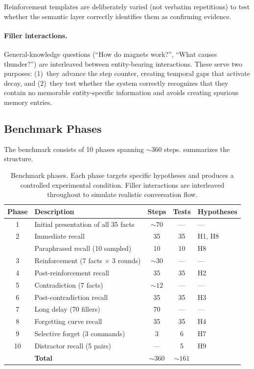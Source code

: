 \smallskip
\noindent Reinforcement templates are deliberately varied (not verbatim repetitions) to test whether the semantic layer correctly identifies them as confirming evidence.

\paragraph{Filler interactions.}
General-knowledge questions (``How do magnets work?'', ``What causes thunder?'') are interleaved between entity-bearing interactions. These serve two purposes: (1)~they advance the step counter, creating temporal gaps that activate decay, and (2)~they test whether the system correctly recognizes that they contain no memorable entity-specific information and avoids creating spurious memory entries.

\subsection{Benchmark Phases}
\label{sec:bench-phases}

The benchmark consists of 10 phases spanning ${\sim}360$ steps.  summarizes the structure.

\begin{table}[t]
  \centering
  \caption{Benchmark phases. Each phase targets specific hypotheses and produces a controlled experimental condition. Filler interactions are interleaved throughout to simulate realistic conversation flow.}
  \label{tab:phases}
  \small
  \begin{tabular}{@{}c l c c l@{}}
    \toprule
    \textbf{Phase} & \textbf{Description} & \textbf{Steps} & \textbf{Tests} & \textbf{Hypotheses} \\
    \midrule
    \rowcolor{nodeGray}
    1 & Initial presentation of all 35 facts & ${\sim}70$ & --- & --- \\
    2 & Immediate recall & 35 & 35 & H1, H8 \\
    \rowcolor{nodeGray}
      & Paraphrased recall (10 sampled) & 10 & 10 & H8 \\
    3 & Reinforcement (7 facts $\times$ 3 rounds) & ${\sim}30$ & --- & --- \\
    \rowcolor{nodeGray}
    4 & Post-reinforcement recall & 35 & 35 & H2 \\
    5 & Contradiction (7 facts) & ${\sim}12$ & --- & --- \\
    \rowcolor{nodeGray}
    6 & Post-contradiction recall & 35 & 35 & H3 \\
    7 & Long delay (70 fillers) & 70 & --- & --- \\
    \rowcolor{nodeGray}
    8 & Forgetting curve recall & 35 & 35 & H4 \\
    9 & Selective forget (3 commands) & 3 & 6 & H7 \\
    \rowcolor{nodeGray}
    10 & Distractor recall (5 pairs) & --- & 5 & H9 \\
    \midrule
    & \textbf{Total} & ${\sim}360$ & ${\sim}161$ & \\
    \bottomrule
  \end{tabular}
\end{table}

